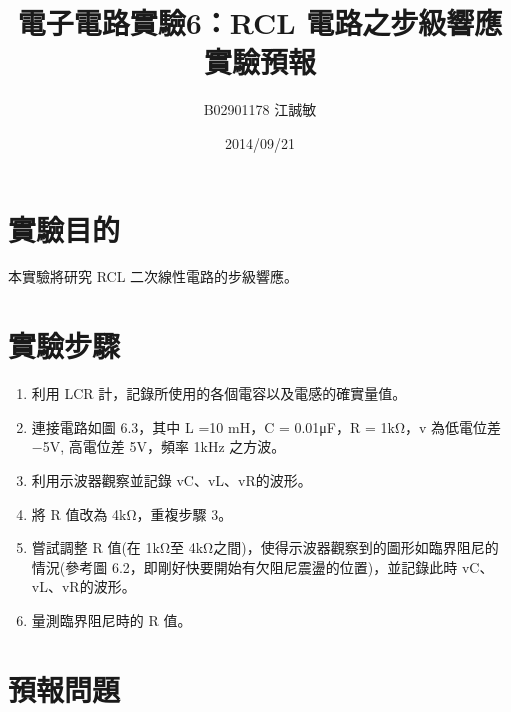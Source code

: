 \documentclass[12pt, a4paper]{article}
\title{ \bf {\huge 電子電路實驗6：RCL 電路之步級響應}\\ 實驗預報}
\author{B02901178 江誠敏}
\date{2014/09/21}
\begin{document}
\maketitle

\section{實驗目的}
本實驗將研究 RCL 二次線性電路的步級響應。
\section{實驗步驟}
\begin{enumerate}[itemsep=0pt]
  \item 利用 LCR 計，記錄所使用的各個電容以及電感的確實量值。
  \item 連接電路如圖 6.3，其中 L =10 mH，C = 0.01μF，R = 1kΩ，v 為低電位差−5V, 高電位差 5V，頻率 1kHz 之方波。
  \item 利用示波器觀察並記錄 vC、vL、vR的波形。
  \item 將 R 值改為 4kΩ，重複步驟 3。
  \item 嘗試調整 R 值(在 1kΩ至 4kΩ之間)，使得示波器觀察到的圖形如臨界阻尼的情況(參考圖 6.2，即剛好快要開始有欠阻尼震盪的位置)，並記錄此時 vC、vL、vR的波形。
  \item 量測臨界阻尼時的 R 值。
\end{enumerate}


  \begin{center}
  \end{center}


  \section{預報問題}
\end{document}
